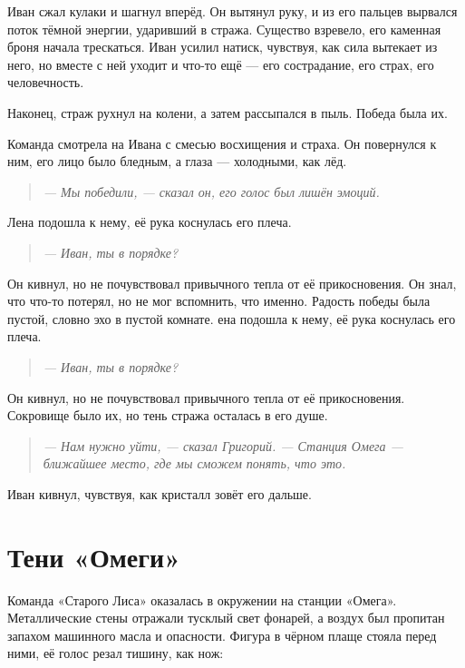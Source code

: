 \documentclass[12pt,a4paper]{book} %
\newenvironment{dialogue}{\begin{quote}\itshape}{\end{quote}}
\begin{document}
Иван сжал кулаки и шагнул вперёд. Он вытянул руку, и из его пальцев вырвался поток тёмной энергии, ударивший в стража. Существо взревело, его каменная броня начала трескаться. Иван усилил натиск, чувствуя, как сила вытекает из него, но вместе с ней уходит и что-то ещё --- его сострадание, его страх, его человечность.

Наконец, страж рухнул на колени, а затем рассыпался в пыль. Победа была их.

Команда смотрела на Ивана с смесью восхищения и страха. Он повернулся к ним, его лицо было бледным, а глаза --- холодными, как лёд.

\begin{dialogue}
--- Мы победили, --- сказал он, его голос был лишён эмоций.
\end{dialogue}

Лена подошла к нему, её рука коснулась его плеча.

\begin{dialogue}
--- Иван, ты в порядке?
\end{dialogue}

Он кивнул, но не почувствовал привычного тепла от её прикосновения. Он знал, что что-то потерял, но не мог вспомнить, что именно. Радость победы была пустой, словно эхо в пустой комнате.
ена подошла к нему, её рука коснулась его плеча.

\begin{dialogue}
--- Иван, ты в порядке?
\end{dialogue}

Он кивнул, но не почувствовал привычного тепла от её прикосновения. Сокровище было их, но тень стража осталась в его душе.

\begin{dialogue}
--- Нам нужно уйти, --- сказал Григорий. --- Станция Омега --- ближайшее место, где мы сможем понять, что это.
\end{dialogue}

Иван кивнул, чувствуя, как кристалл зовёт его дальше.

\chapter{Тени «Омеги»}

Команда «Старого Лиса» оказалась в окружении на станции «Омега». Металлические стены отражали тусклый свет фонарей, а воздух был пропитан запахом машинного масла и опасности. Фигура в чёрном плаще стояла перед ними, её голос резал тишину, как нож:
\end{document}
